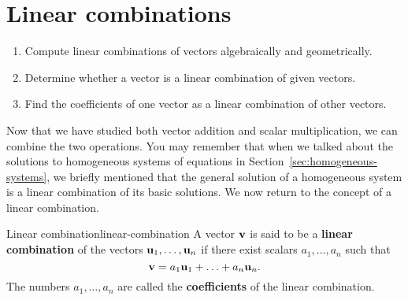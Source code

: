 \section{Linear combinations}
\label{sec:linear-combinations-rn}

\begin{outcome}
  \begin{enumerate}
  \item Compute linear combinations of vectors algebraically and
    geometrically.
  \item Determine whether a vector is a linear combination of given
    vectors.
  \item Find the coefficients of one vector as a linear combination of
    other vectors.
  \end{enumerate}
\end{outcome}

Now that we have studied both vector addition and scalar
multiplication, we can combine the two operations. You may remember
that when we talked about the solutions to homogeneous systems of
equations in Section~\ref{sec:homogeneous-systems}, we briefly
mentioned that the general solution of a homogeneous system is a
linear combination of its basic solutions. We now return to the
concept of a linear combination.

\begin{definition}{Linear combination}{linear-combination}
  A vector $\vect{v}$ is said to be a \textbf{linear combination}%
   of the vectors
  $\vect{u}_1,\ldots, \vect{u}_n$ if there exist scalars
  $a_1,\ldots,a_n$ such that
  \begin{equation*}
    \vect{v} = a_1 \vect{u}_1 + \ldots + a_n \vect{u}_n.
  \end{equation*}
  The numbers $a_1,\ldots,a_n$ are called the \textbf{coefficients}%
   of the linear combination.
\end{definition}

